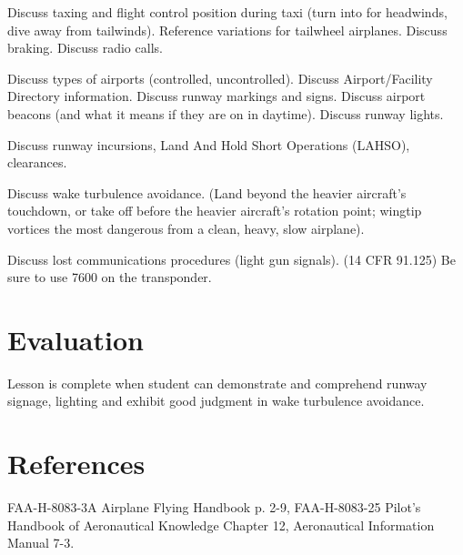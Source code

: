 \documentclass[twoside,openright]{report}
\begin{document}
Discuss taxing and flight control position during taxi (turn into for
headwinds, dive away from tailwinds). Reference variations for tailwheel
airplanes. Discuss braking. Discuss radio calls.

Discuss types of airports (controlled, uncontrolled). Discuss Airport/Facility
Directory information. Discuss runway markings and signs. Discuss airport
beacons (and what it means if they are on in daytime). Discuss runway lights.

Discuss runway incursions, Land And Hold Short Operations (LAHSO), clearances.

Discuss wake turbulence avoidance. (Land beyond the heavier aircraft’s
touchdown, or take off before the heavier aircraft’s rotation point; wingtip
vortices the most dangerous from a clean, heavy, slow airplane).

Discuss lost communications procedures (light gun signals). (14 CFR 91.125) Be
sure to use 7600 on the transponder.

\section{Evaluation}

Lesson is complete when student can demonstrate and comprehend runway signage,
lighting and exhibit good judgment in wake turbulence avoidance.

\section{References}

FAA-H-8083-3A Airplane Flying Handbook p. 2-9, FAA-H-8083-25 Pilot's Handbook
of Aeronautical Knowledge Chapter 12, Aeronautical Information Manual 7-3.
\end{document}
